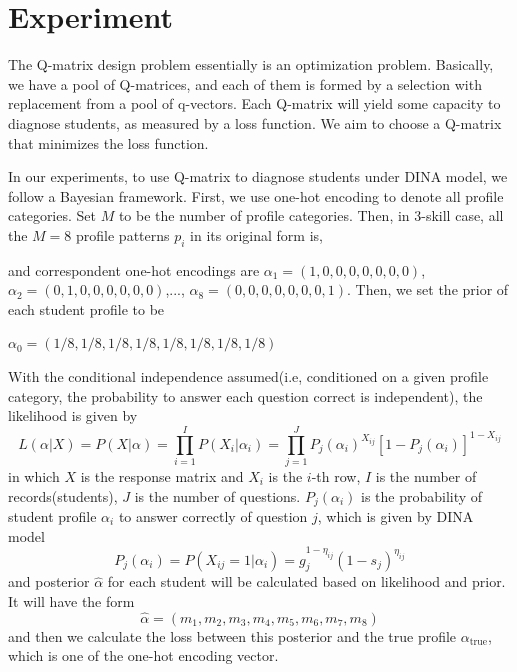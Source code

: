 \documentclass{edm_template}
\newcommand{\Michel}[1]{{\textcolor{red}{[#1]}}}
\begin{document}
\section{Experiment}
The Q-matrix design problem essentially is an optimization problem. Basically, we have a pool of Q-matrices, and each of them is formed by a selection with replacement from a pool of q-vectors. Each Q-matrix will yield some capacity to diagnose students, as measured by a loss function. We aim to choose a Q-matrix that minimizes the loss function.

In our experiments, to use Q-matrix to diagnose students under DINA model, we follow a Bayesian framework. First, we use one-hot encoding to denote all profile categories. Set $M$ to be the number of profile categories. Then, in 3-skill case, all the $M=8$ profile patterns $p_i$ in its original form is,

and correspondent one-hot encodings are $\alpha_1=(1,0,0,0,0,0,0,0)$, $\alpha_2=(0,1,0,0,0,0,0,0)$,...,
$\alpha_8=(0,0,0,0,0,0,0,1)$.
Then, we set the prior of each student profile to be 

$\alpha_0=(1/8,1/8,1/8,1/8,1/8,1/8,1/8,1/8)$ 

With the conditional independence assumed(i.e, conditioned on a given profile category, the probability to answer each question correct is independent), the likelihood is given by \cite{de2009dina}
$$ L(\alpha|X) = P(X|\alpha) = \prod_{i=1}^I P(X_i|\alpha_i) = \prod_{j=1}^J P_j(\alpha_i)^{X_{ij}}[1-P_j(\alpha_i)]^{1-X_{ij}}$$
in which $X$ is the response matrix and $X_i$ is the $i$-th row, $I$ is the number of records(students), $J$ is the  number of questions. $P_j(\alpha_i)$ is the probability of student profile $\alpha_i$ to answer correctly of question $j$, which is given by DINA model
$$ P_j(\alpha_i) = P(X_{ij}=1|\alpha_i)=g_j^{1-\eta_{ij}}(1-s_j)^{\eta_{ij}}$$
and posterior $\hat{\alpha}$ for each student will be calculated based on likelihood and prior. It will have the form
$$\hat{\alpha} = (m_1,m_2,m_3,m_4,m_5,m_6,m_7,m_8)$$ 
and then we calculate the loss between this posterior and the true profile $\alpha_{\mathrm{true}}$, which is one of the one-hot encoding vector. 
\end{document}
